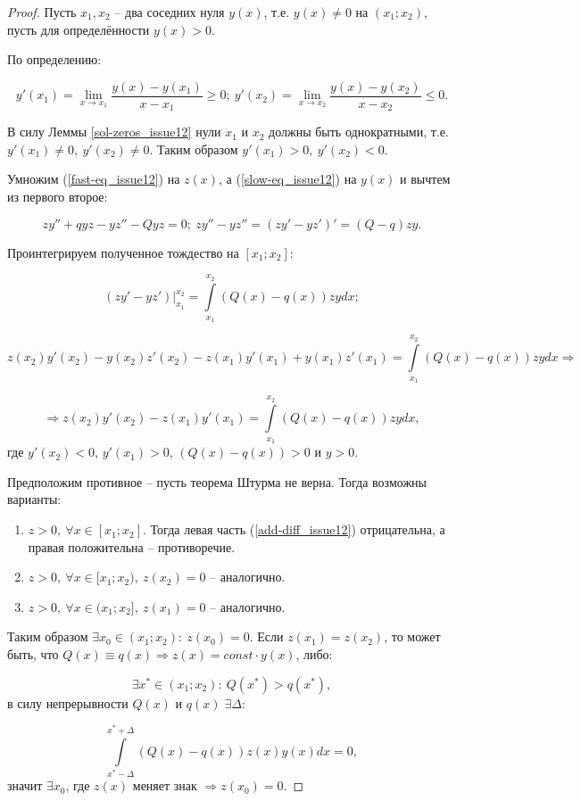 \begin{proof}
Пусть $x_1, x_2$ -- два соседних нуля $y(x)$, т.е. $y(x) \neq 0$ на $(x_1;x_2)$, пусть для определённости $y(x) > 0$.

По определению:

\[y'(x_1) = \lim\limits_{x\rightarrow x_1} \frac{y(x) - y(x_1)}{x - x_1} \geqslant 0; \: y'(x_2) = \lim\limits_{x\rightarrow x_2} \frac{y(x) - y(x_2)}{x - x_2} \leqslant 0 .\]

В силу Леммы \ref{sol-zeros_issue12} нули $x_1$ и $x_2$ должны быть однократными, т.е. $y'(x_1) \neq 0, \: y'(x_2) \neq 0$. Таким образом $y'(x_1) > 0, \: y'(x_2) < 0$.

Умножим (\ref{fast-eq_issue12}) на $z(x)$, а (\ref{slow-eq_issue12}) на $y(x)$ и вычтем из первого второе:

\[zy'' + qyz - yz'' - Qyz = 0; \: zy'' - yz'' = (zy'-yz')' = (Q - q)zy.\]

Проинтегрируем полученное тождество на $[x_1;x_2]$:

\[(zy' - yz')\Big\vert_{x_1}^{x_2} = \int\limits_{x_1}^{x_2} (Q(x) - q(x))zydx;\]

\[z(x_2)y'(x_2) - y(x_2)z'(x_2) - z(x_1)y'(x_1) + y(x_1)z'(x_1) = \int\limits_{x_1}^{x_2}(Q(x) - q(x))zydx \Rightarrow\]

\begin{equation}\label{add-diff_issue12} %
\Rightarrow z(x_2)y'(x_2) - z(x_1)y'(x_1) = \int\limits_{x_1}^{x_2}(Q(x) - q(x))zydx,
\end{equation}
где $y'(x_2) < 0$, $y'(x_1) > 0$, $(Q(x) - q(x)) > 0$ и $y > 0$.

Предположим противное -- пусть теорема Штурма не верна. Тогда возможны варианты:

\begin{enumerate}
\item $z > 0, \: \forall x \in [x_1;x_2].$ Тогда левая часть (\ref{add-diff_issue12}) отрицательна, а правая положительна -- противоречие.

\item $z > 0, \: \forall x \in [x_1;x_2), \: z(x_2) = 0$ -- аналогично.

\item $z > 0, \: \forall x \in (x_1;x_2], \: z(x_1) = 0$ -- аналогично.
\end{enumerate}

Таким образом $\exists x_0 \in (x_1;x_2): \: z(x_0) = 0$. Если $z(x_1) = z(x_2)$, то может быть, что $Q(x) \equiv q(x) \Rightarrow z(x) = const \cdot y(x)$, либо:

\[\exists x^{*} \in (x_1;x_2): \: Q(x^{*}) > q(x^{*}),\]
в силу непрерывности $Q(x)$ и $q(x) \; \exists \Delta:$

\[\int\limits_{x^{*} -\Delta}^{x^{*} + \Delta} (Q(x) - q(x))z(x)y(x)dx = 0,\]
значит $\exists x_0$, где $z(x)$ меняет знак $\Rightarrow z(x_0) = 0$.
\end{proof}

